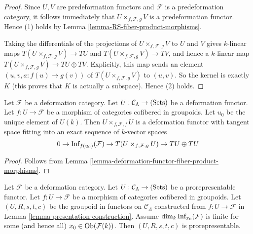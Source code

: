 \begin{proof}
Since $U,V$ are predeformation functors and $\mathcal F$ is a predeformation 
category, it follows immediately that $U \times_{f, \mathcal F, g} V$ is a 
predeformation functor.  Hence (1) holds by Lemma 
\ref{lemma-RS-fiber-product-morphisms}.

\medskip \noindent
Taking the differentials of the projections of $U \times_{f, \mathcal F, g} V$ 
to $U$ and $V$ gives $k$-linear maps $T(U \times_{f, \mathcal F, g} V) 
\rightarrow TU$ and $T(U \times_{f, \mathcal F, g} V) \rightarrow TV$, and 
hence a $k$-linear map $T(U \times_{f, \mathcal F, g} V) \rightarrow TU \oplus 
TV$.  Explicitly, this map sends an element $(u,v,a: f(u) \rightarrow g(v))$ of 
$T(U \times_{f, \mathcal F, g} V)$ to $(u,v)$.  So the kernel is exactly $K$ 
(this proves that $K$ is actually a subspace). Hence (2) holds.
\end{proof}

\begin{lemma}
\label{lemma-deformation-functor-diagonal}
Let $\mathcal F$ be a deformation category.  Let $U: \mathcal C_{\Lambda} 
\rightarrow \textnormal{(Sets)}$ be a deformation functor.  Let $f: U 
\rightarrow \mathcal F$ be a morphism of categories cofibered in groupoids. Let 
$u_0$ be the unique element of $U(k)$.  Then $U \times_{f,\mathcal F,f} U$ is a 
deformation functor with tangent space fitting into an exact sequence of 
$k$-vector spaces
\[ 
0 \rightarrow \textnormal{Inf}_{f(u_0)}(\mathcal F) \rightarrow T(U \times_{f, 
\mathcal F, g} U) \rightarrow TU \oplus TU 
\]
\end{lemma}

\begin{proof}
Follows from Lemma \ref{lemma-deformation-functor-fiber-product-morphisms}.
\end{proof}

\begin{lemma}
\label{lemma-prorepresentable-groupoid-in-functors-construction}
Let $\mathcal F$ be a deformation category.  Let $U: \mathcal C_{\Lambda} 
\rightarrow \textnormal{(Sets)}$ be a prorepresentable functor.  Let $f: U 
\rightarrow \mathcal F$ be a morphism of categories cofibered in groupoids.  
Let $(U,R,s,t,c)$ be the groupoid in functors on $\mathcal C_{\Lambda}$ 
constructed from $f: U \rightarrow \mathcal F$ in Lemma 
\ref{lemma-presentation-construction}. Assume $\dim_{k} 
\textnormal{Inf}_{x_0}(\mathcal F)$ is finite for some (and hence all) $x_0 \in 
\textnormal{Ob}(\mathcal F(k))$.  Then  $(U,R,s,t,c)$ is prorepresentable.
\end{lemma}

